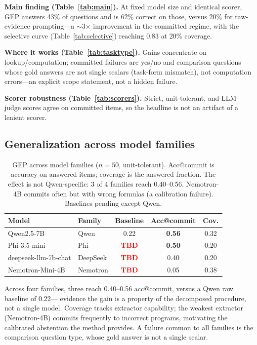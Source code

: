\documentclass[sigconf,nonacm]{acmart}
\newcommand{\tbd}{\textcolor{red}{\textbf{TBD}}}
\begin{document}
\textbf{Main finding (Table~\ref{tab:main}).} At fixed model size and identical scorer,
\textsc{GEP} answers 43\% of questions and is 62\% correct on those, versus 20\% for
raw-evidence prompting---a $\sim$3$\times$ improvement in the committed regime, with the
selective curve (Table~\ref{tab:selective}) reaching 0.83 at 20\% coverage.

\textbf{Where it works (Table~\ref{tab:tasktype}).} Gains concentrate on lookup/computation;
committed failures are yes/no and comparison questions whose gold answers are not single scalars
(task-form mismatch), not computation errors---an explicit scope statement, not a hidden failure.

\textbf{Scorer robustness (Table~\ref{tab:scorers}).} Strict, unit-tolerant, and LLM-judge scores
agree on committed items, so the headline is not an artifact of a lenient scorer.

\subsection{Generalization across model families}
\begin{table}[t]
\caption{\textsc{GEP} across model families ($n{=}50$, unit-tolerant). Acc@commit is
accuracy on answered items; coverage is the answered fraction. The effect is not
Qwen-specific: 3 of 4 families reach 0.40--0.56. Nemotron-4B commits often but with wrong
formulas (a calibration failure). Baselines pending except Qwen.}
\label{tab:models}
\begin{tabular}{llccc}
\toprule
Model & Family & Baseline & Acc@commit & Cov. \\
\midrule
Qwen2.5-7B & Qwen & 0.22 & \textbf{0.56} & 0.32 \\
Phi-3.5-mini & Phi & \tbd & \textbf{0.50} & 0.20 \\
deepseek-llm-7b-chat & DeepSeek & \tbd & 0.40 & 0.20 \\
Nemotron-Mini-4B & Nemotron & \tbd & 0.05 & 0.38 \\
\bottomrule
\end{tabular}
\end{table}
Across four families, three reach 0.40--0.56 acc@commit, versus a Qwen raw baseline of 0.22---
evidence the gain is a property of the decomposed procedure, not a single model. Coverage tracks
extractor capability; the weakest extractor (Nemotron-4B) commits frequently to incorrect
programs, motivating the calibrated abstention the method provides. A failure common to all
families is the comparison question type, whose gold answer is not a single scalar.
\end{document}
